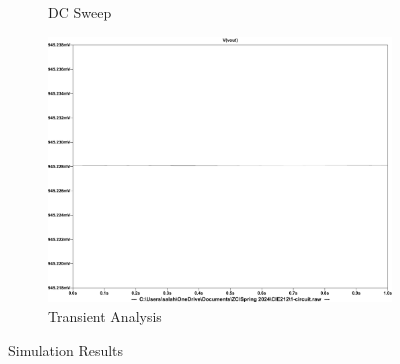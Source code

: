 \documentclass{zc-ust-hw}
\begin{document}
\begin{enumerate}
\begin{figure}[H]
\begin{subfigure}{0.45\textwidth}
        \caption{DC Sweep}
      \end{subfigure}%
      \begin{subfigure}{0.45\textwidth}
        \centering
        \includegraphics[width=\textwidth]{figures/1-transient.pdf}
        \caption{Transient Analysis}
      \end{subfigure}
      \caption{Simulation Results}
    \end{figure}
    
    \newpage


\end{enumerate}
\end{document}

